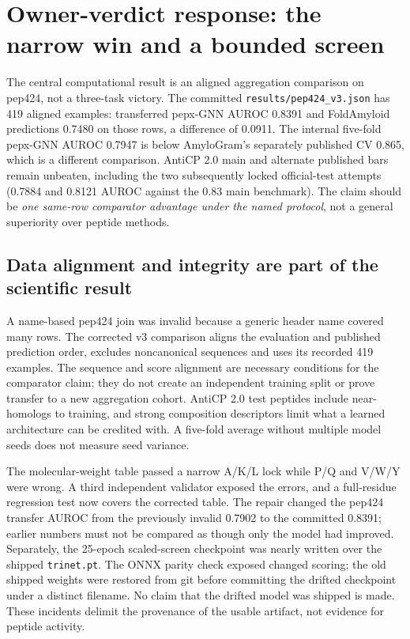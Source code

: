 \hypertarget{owner-verdict-response-the-narrow-win-and-a-bounded-screen}{%
\section{Owner-verdict response: the narrow win and a bounded
screen}\label{owner-verdict-response-the-narrow-win-and-a-bounded-screen}}

The central computational result is an aligned aggregation comparison on
pep424, not a three-task victory. The committed
\texttt{results/pep424\_v3.json} has 419 aligned examples: transferred
pepx-GNN AUROC 0.8391 and FoldAmyloid predictions 0.7480 on those rows,
a difference of 0.0911. The internal five-fold pepx-GNN AUROC 0.7947 is
below AmyloGram's separately published CV 0.865, which is a different
comparison. AntiCP 2.0 main and alternate published bars remain
unbeaten, including the two subsequently locked official-test attempts
(0.7884 and 0.8121 AUROC against the 0.83 main benchmark). The claim
should be \emph{one same-row comparator advantage under the named
protocol}, not a general superiority over peptide methods.

\hypertarget{data-alignment-and-integrity-are-part-of-the-scientific-result}{%
\subsection{Data alignment and integrity are part of the scientific
result}\label{data-alignment-and-integrity-are-part-of-the-scientific-result}}

A name-based pep424 join was invalid because a generic header name
covered many rows. The corrected v3 comparison aligns the evaluation and
published prediction order, excludes noncanonical sequences and uses its
recorded 419 examples. The sequence and score alignment are necessary
conditions for the comparator claim; they do not create an independent
training split or prove transfer to a new aggregation cohort. AntiCP 2.0
test peptides include near-homologs to training, and strong composition
descriptors limit what a learned architecture can be credited with. A
five-fold average without multiple model seeds does not measure seed
variance.

The molecular-weight table passed a narrow A/K/L lock while P/Q and
V/W/Y were wrong. A third independent validator exposed the errors, and
a full-residue regression test now covers the corrected table. The
repair changed the pep424 transfer AUROC from the previously invalid
0.7902 to the committed 0.8391; earlier numbers must not be compared as
though only the model had improved. Separately, the 25-epoch
scaled-screen checkpoint was nearly written over the shipped
\texttt{trinet.pt}. The ONNX parity check exposed changed scoring; the
old shipped weights were restored from git before committing the drifted
checkpoint under a distinct filename. No claim that the drifted model
was shipped is made. These incidents delimit the provenance of the
usable artifact, not evidence for peptide activity.

